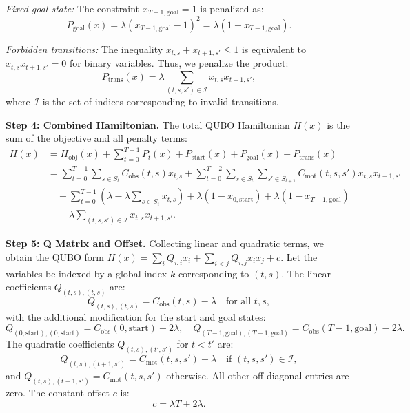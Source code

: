 \documentclass[12pt]{article}
\begin{document}
\textit{Fixed goal state:}
The constraint $x_{T-1, \text{goal}} = 1$ is penalized as:
\begin{equation}
P_{\text{goal}}(x) = \lambda (x_{T-1, \text{goal}} - 1)^2 = \lambda (1 - x_{T-1, \text{goal}}).
\end{equation}

\textit{Forbidden transitions:}
The inequality $x_{t,s} + x_{t+1,s'} \leq 1$ is equivalent to $x_{t,s} x_{t+1,s'} = 0$ for binary variables. Thus, we penalize the product:
\begin{equation}
P_{\text{trans}}(x) = \lambda \sum_{(t,s,s') \in \mathcal{I}} x_{t,s} x_{t+1,s'},
\end{equation}
where $\mathcal{I}$ is the set of indices corresponding to invalid transitions.

\textbf{Step 4: Combined Hamiltonian.}
The total QUBO Hamiltonian $H(x)$ is the sum of the objective and all penalty terms:
\begin{align}
H(x) &= H_{\text{obj}}(x) + \sum_{t=0}^{T-1} P_t(x) + P_{\text{start}}(x) + P_{\text{goal}}(x) + P_{\text{trans}}(x) \\
&= \sum_{t=0}^{T-1} \sum_{s \in S_t} C_{\text{obs}}(t,s) x_{t,s} + \sum_{t=0}^{T-2} \sum_{s \in S_t} \sum_{s' \in S_{t+1}} C_{\text{mot}}(t,s,s') x_{t,s} x_{t+1,s'} \\
&\quad + \sum_{t=0}^{T-1} \left( \lambda - \lambda \sum_{s \in S_t} x_{t,s} \right) + \lambda (1 - x_{0, \text{start}}) + \lambda (1 - x_{T-1, \text{goal}}) \\
&\quad + \lambda \sum_{(t,s,s') \in \mathcal{I}} x_{t,s} x_{t+1,s'}.
\end{align}

\textbf{Step 5: Q Matrix and Offset.}
Collecting linear and quadratic terms, we obtain the QUBO form $H(x) = \sum_{i} Q_{i,i} x_i + \sum_{i<j} Q_{i,j} x_i x_j + c$.
Let the variables be indexed by a global index $k$ corresponding to $(t,s)$.
The linear coefficients $Q_{(t,s),(t,s)}$ are:
\begin{equation}
Q_{(t,s),(t,s)} = C_{\text{obs}}(t,s) - \lambda \quad \text{for all } t, s,
\end{equation}
with the additional modification for the start and goal states:
\begin{equation}
Q_{(0,\text{start}),(0,\text{start})} = C_{\text{obs}}(0,\text{start}) - 2\lambda, \quad
Q_{(T-1,\text{goal}),(T-1,\text{goal})} = C_{\text{obs}}(T-1,\text{goal}) - 2\lambda.
\end{equation}
The quadratic coefficients $Q_{(t,s),(t',s')}$ for $t < t'$ are:
\begin{equation}
Q_{(t,s),(t+1,s')} = C_{\text{mot}}(t,s,s') + \lambda \quad \text{if } (t,s,s') \in \mathcal{I},
\end{equation}
and $Q_{(t,s),(t+1,s')} = C_{\text{mot}}(t,s,s')$ otherwise. All other off-diagonal entries are zero.
The constant offset $c$ is:
\begin{equation}
c = \lambda T + 2\lambda.
\end{equation}
\end{document}
